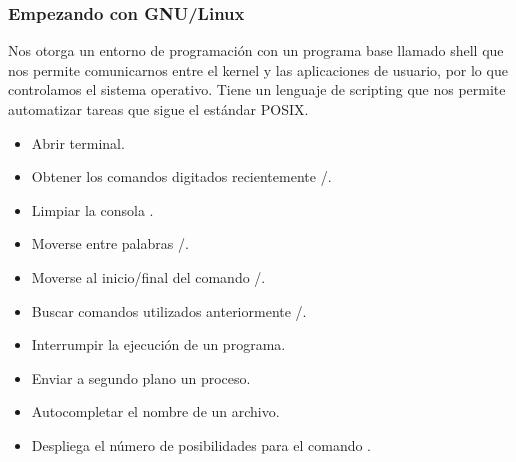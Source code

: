 \begin{frame}
	\frametitle{Empezando con GNU/Linux}

	Nos otorga un entorno de programación con un programa base
	llamado shell que nos permite comunicarnos entre el kernel y las
	aplicaciones de usuario, por lo que controlamos el sistema
	operativo.
	Tiene un lenguaje de scripting que nos permite automatizar tareas
	que sigue el estándar POSIX.

	\begin{itemize}
		\item

		      Abrir terminal\quad{}.

		\item

		      Obtener los comandos digitados recientemente
		      \quad\keys{\arrowkeyup}/\keys{\arrowkeydown}.

		\item

		      Limpiar la consola \quad{}.

		\item

		      Moverse entre palabras \quad{}/.

		\item

		      Moverse al inicio/final del comando
		      \quad{}/.

		\item

		      Buscar comandos utilizados anteriormente
		      \quad{}/.

		\item

		      Interrumpir la ejecución de un programa\quad{}.

		\item

		      Enviar a segundo plano un proceso\quad{}.

		\item

		      Autocompletar el nombre de un archivo\quad\keys{\tab}.

		\item

		      Despliega el número de posibilidades para el comando
		      \quad\keys{\tab+\tab}.
	\end{itemize}
\end{frame}

